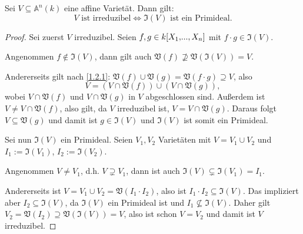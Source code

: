 \documentclass[a4paper,12pt]{scrbook}
\newtheorem{proof}{Beweis}
\def\A{\mathbb{A}}
\def\V{\mathfrak{V}}
\def\I{\mathfrak{I}}
\renewcommand{\dotsc}{\ensuremath{\!...}}
\newcommand{\polyx}[1][n]{\ensuremath%
  [X_{1},\dotsc,X_{#1}]}
\begin{document}
\begin{bem}\label{1.2.9}
Sei $V\subseteq\A^{n}(k)$ eine affine Varietät. Dann gilt:
\[V\text{ ist irreduzibel}\iff\I(V)\text{ ist ein Primideal}.\]
\end{bem}
\begin{proof}
Sei zuerst $V$ irreduzibel. Seien $f,g\in k\polyx$ mit $f\cdot g\in\I(V)$. 

Angenommen $f\notin\I(V)$, dann gilt auch $\V(f)\not\supseteq\V(\I(V))=V$.

Andererseits gilt nach \cref{1.2.1}: $\V(f)\cup\V(g)=\V(f\cdot g)\supseteq V$, also
\[V=(V\cap \V(f))\cup(V\cap\V(g)),\]
wobei $V\cap\V(f)$ und $V\cap\V(g)$ in $V$ abgeschlossen sind. Außerdem ist $V\neq V\cap\V(f)$, also gilt, da $V$ irreduzibel ist, $V=V\cap\V(g)$. Daraus folgt $V\subseteq\V(g)$ und damit ist $g\in\I(V)$ und $\I(V)$ ist somit ein Primideal.

Sei nun $\I(V)$ ein Primideal. Seien $V_{1},V_{2}$ Varietäten mit $V=V_{1}\cup V_{2}$ und $I_{1}:=\I(V_{1})$, $I_{2}:=\I(V_{2})$.

Angenommen $V\neq V_{1}$, d.h. $V\supsetneq V_{1}$, dann ist auch $\I(V)\subsetneq\I(V_{1})=I_{1}$.

Andererseits ist $V=V_{1}\cup V_{2}=\V(I_{1}\cdot I_{2})$, also ist $I_{1}\cdot I_{2}\subseteq\I(V)$. Das impliziert aber $I_{2}\subseteq\I(V)$, da $\I(V)$ ein Primideal ist und $I_{1}\not\subseteq\I(V)$. Daher gilt $V_{2}=\V(I_{2})\supseteq\V(\I(V))=V$, also ist schon $V=V_{2}$ und damit ist $V$ irreduzibel.
\end{proof}
\end{document}
